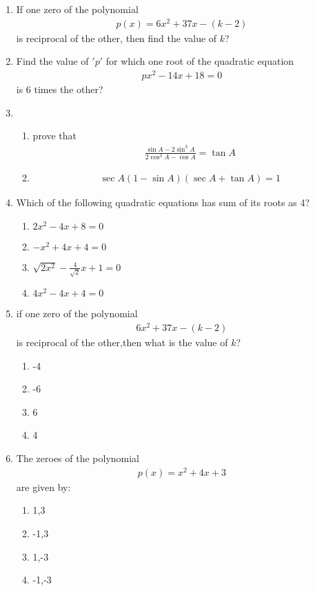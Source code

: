 %
\begin{enumerate}
 \item If one zero of the polynomial \begin{align} p(x)=6x^2+37x-(k-2) \end{align} is reciprocal of the other, then find the value of $k$?
 \item Find the value of $'p'$ for which one root of the quadratic equation \begin{align} px^2-14x+18=0 \end{align}is 6 times the other?
 \item 
 \begin{enumerate}
  \item prove that \begin{align} \frac{\sin A-2 \sin^3A}{2\cos^3A-\cos A}=\tan A\end{align} 
  \item \begin{align} \sec A (1-\sin A)(\sec A+\tan A)=1\end{align} 
  \end{enumerate}
  \item Which of the following  quadratic equations has sum of its roots as 4?
  \begin{enumerate}
      \item $2x^2-4x+8=0$ 
      \item $-x^2+4x+4=0$
      \item $\sqrt{2x^2}-\frac{4}{\sqrt{2}}x+1=0$ 
      \item $4x^2-4x+4=0$
   \end{enumerate}
   \item if one zero of the polynomial \begin{align} 6x^2+37x-(k-2)\end{align}  is reciprocal of the other,then what is the value of $k$?
   \begin{enumerate}
       \item -4
       \item -6
       \item 6
       \item 4
   \end{enumerate}
   \item The zeroes of the polynomial \begin{align}p(x)=x^2+4x+3\end{align}  are given by:
   \begin{enumerate}
       \item 1,3
       \item -1,3
       \item 1,-3
       \item -1,-3
   \end{enumerate}
\end{enumerate}
%
